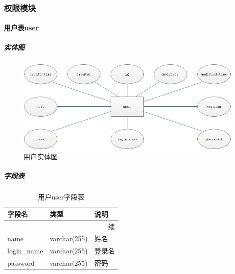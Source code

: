 \documentclass[titlepage,UTF8,linespread=1.5]{ctexart}
\begin{document}
\subsubsection{权限模块}
\paragraph{用户表user}
\subparagraph{实体图}
\begin{figure}[H]
    \centering
    \includegraphics[width=140mm]{entity-user.png}
    \caption{用户实体图}
    \label{fig:entity-user}
\end{figure}
\subparagraph{字段表}
\begin{longtable}{|p{10em}|p{6em}|p{15em}|}
    \caption{用户user字段表}\label{tab:table_user}       \\\hline
    字段名         & 类型         & 说明                 \\\hline
    \endfirsthead
    \multicolumn{3}{r}{{续\tablename\thetable{}}}        \\\hline
    \endhead
    name           & varchar(255) & 姓名                 \\\hline
    login\_name    & varchar(255) & 登录名               \\\hline
    password       & varchar(255) & 密码                 \\\hline
\end{longtable}\par
\end{document}
